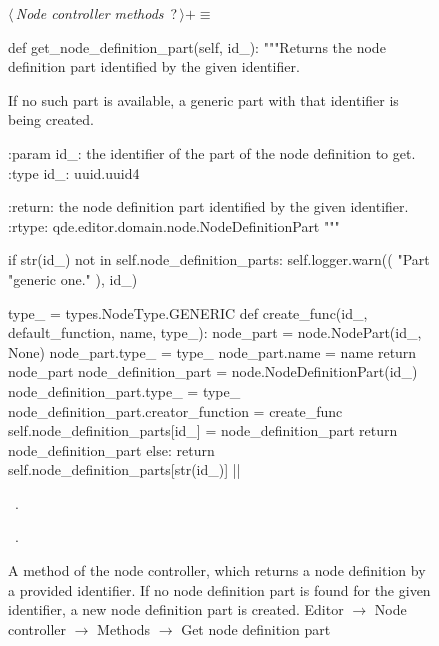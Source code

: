 \documentclass[%
    a4paper,    %
    justified,  %
    nobib,      %
    openany     %
]{tufte-book}
\begin{document}
\begin{figure}
\begin{flushleft} \small
\begin{minipage}{\linewidth}\label{scrap128}\raggedright\small
{} $\langle\,${\itshape Node controller methods}\nobreak\ {\footnotesize {?}}$\,\rangle+\equiv$
\vspace{-1ex}
\begin{pythoncode}
def get_node_definition_part(self, id_):
    """Returns the node definition part identified by the given identifier.

    If no such part is available, a generic part with that identifier is being
    created.

    :param id_: the identifier of the part of the node definition to get.
    :type  id_: uuid.uuid4

    :return: the node definition part identified by the given identifier.
    :rtype: qde.editor.domain.node.NodeDefinitionPart
    """

    if str(id_) not in self.node_definition_parts:
        self.logger.warn((
            "Part %
            "generic one."
        ), id_)

        type_ = types.NodeType.GENERIC
        def create_func(id_, default_function, name, type_):
            node_part = node.NodePart(id_, None)
            node_part.type_ = type_
            node_part.name = name
            return node_part
        node_definition_part = node.NodeDefinitionPart(id_)
        node_definition_part.type_ = type_
        node_definition_part.creator_function = create_func
        self.node_definition_parts[id_] = node_definition_part
        return node_definition_part
    else:
        return self.node_definition_parts[str(id_)]
|\NWsep|
\end{pythoncode}
\vspace{1.5ex}
\footnotesize
\begin{list}{}{\setlength{\itemsep}{-\parsep}\setlength{\itemindent}{-\leftmargin}}
\item \NWtxtMacroDefBy\ .
\item \NWtxtMacroRefIn\ .

\item{}
\end{list}
\end{minipage}\vspace{4ex}
\end{flushleft}
\caption{A method of the node controller, which returns a node definition
  by a provided identifier. If no node definition part is found for the given
  identifier, a new node definition part is created.
  \newline{}\newline{}Editor $\rightarrow$ Node controller $\rightarrow$
  Methods $\rightarrow$ Get node definition part}
\label{editor:lst:node-controller:methods:get-node-definition-part}
\end{figure}
\end{document}
